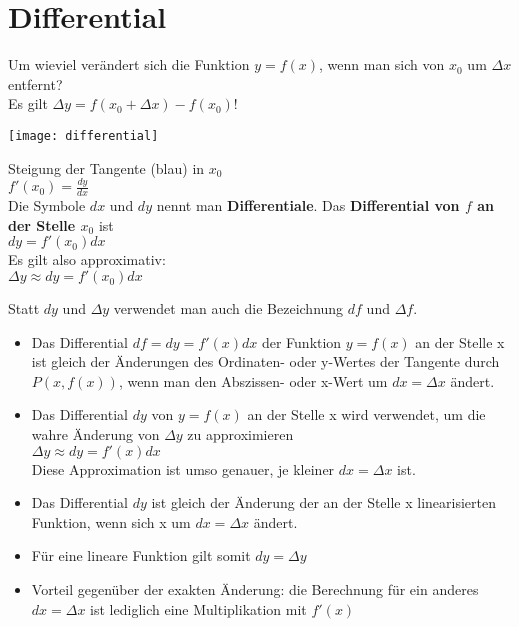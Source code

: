 \documentclass[../main.tex]{subfiles}
\begin{document}
\section{Differential}
Um wieviel verändert sich die Funktion $y = f(x)$, wenn man sich von $x_0$ um $\Delta x$ entfernt? \\
Es gilt $\Delta y = f(x_0 + \Delta x) - f(x_0)$! \\
\begin{minipage}{0.5\textwidth}
    \texttt{[image: differential]}
\end{minipage} \hfill
\begin{minipage}{0.45\textwidth}
    Steigung der Tangente (blau) in $x_0$ \\ [7pt]
    $f'(x_0) = \frac{dy}{dx}$ \\ [7pt]
    Die Symbole $dx$ und $dy$ nennt man \textbf{Differentiale}. Das \textbf{Differential von $f$ an der Stelle $x_0$} ist \\ [7pt]
    $dy = f'(x_0)dx$ \\ [7pt]
    Es gilt also approximativ: \\ [7pt]
    $\Delta y \approx dy = f'(x_0)dx$
\end{minipage}
Statt $dy$ und $\Delta y$ verwendet man auch die Bezeichnung $df$ und $\Delta f$. \\

\begin{itemize}
    \item Das Differential $df = dy = f'(x)dx$ der Funktion $y = f(x)$ an der Stelle x ist gleich der Änderungen des Ordinaten- oder y-Wertes der Tangente durch $P(x,f(x))$, wenn man den Abszissen- oder x-Wert um $dx = \Delta x$ ändert.
    \item Das Differential $dy$ von $y = f(x)$ an der Stelle x wird verwendet, um die wahre Änderung von $\Delta y$ zu approximieren \\ [7pt]
    $\Delta y \approx dy = f'(x)dx$ \\ [7pt]
    Diese Approximation ist umso genauer, je kleiner $dx = \Delta x$ ist.
    \item Das Differential $dy$ ist gleich der Änderung der an der Stelle x linearisierten Funktion, wenn sich x um $dx = \Delta x$ ändert.
    \item Für eine lineare Funktion gilt somit $dy = \Delta y$
    \item Vorteil gegenüber der exakten Änderung: die Berechnung für ein anderes $dx = \Delta x$ ist lediglich eine Multiplikation mit $f'(x)$
\end{itemize}
\end{document}
